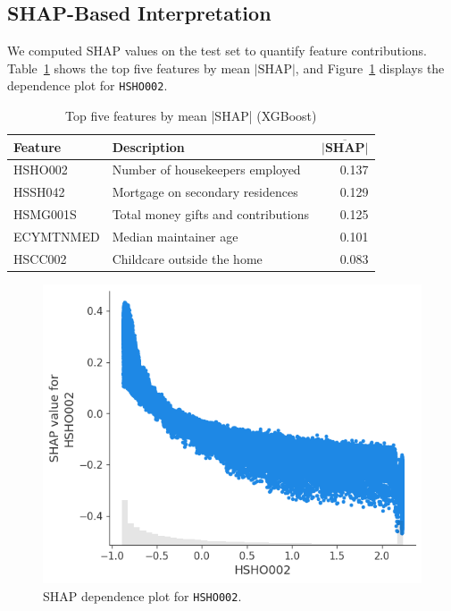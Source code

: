 \documentclass{article}
\begin{document}
\subsection{SHAP-Based Interpretation}
We computed SHAP values on the test set to quantify feature contributions. Table~\ref{tab:shap_top5} shows the top five features by mean $\left|\text{SHAP}\right|$, and Figure~\ref{fig:shap_hsho002} displays the dependence plot for \texttt{HSHO002}.

\begin{table}[ht]
  \centering
  \caption{Top five features by mean |SHAP| (XGBoost)}
  \begin{tabular}{llr}
    \toprule
    \textbf{Feature} & \textbf{Description}                       & $\mathbf{\overline{\lvert\text{SHAP}\rvert}}$ \\
    \midrule
    HSHO002  & Number of housekeepers employed            & 0.137 \\
    HSSH042  & Mortgage on secondary residences           & 0.129 \\
    HSMG001S & Total money gifts and contributions        & 0.125 \\
    ECYMTNMED& Median maintainer age                     & 0.101 \\
    HSCC002  & Childcare outside the home                 & 0.083 \\
    \bottomrule
  \end{tabular}
  \label{tab:shap_top5}
\end{table}

\begin{figure}[ht]
  \centering
  \includegraphics[width=0.75\linewidth]{figures/shap_dependence_hsho002.png}
  \caption{SHAP dependence plot for \texttt{HSHO002}.}
  \label{fig:shap_hsho002}
\end{figure}
\end{document}
